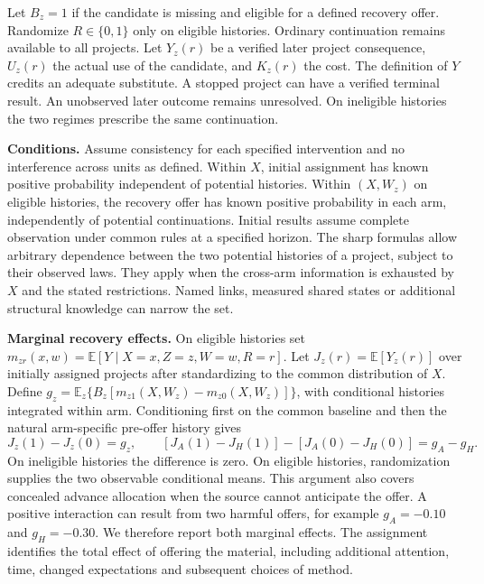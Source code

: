 \documentclass[11pt,a4paper]{article}
\newcommand{\lead}[1]{\textbf{#1}\enspace}
\newcommand{\E}{\mathbb{E}}
\begin{document}
Let $B_z=1$ if the candidate is missing and eligible for a defined recovery offer. Randomize $R\in\{0,1\}$ only on eligible histories. Ordinary continuation remains available to all projects. Let $Y_z(r)$ be a verified later project consequence, $U_z(r)$ the actual use of the candidate, and $K_z(r)$ the cost. The definition of $Y$ credits an adequate substitute. A stopped project can have a verified terminal result. An unobserved later outcome remains unresolved. On ineligible histories the two regimes prescribe the same continuation.

\lead{Conditions.} Assume consistency for each specified intervention and no interference across units as defined. Within $X$, initial assignment has known positive probability independent of potential histories. Within $(X,W_z)$ on eligible histories, the recovery offer has known positive probability in each arm, independently of potential continuations. Initial results assume complete observation under common rules at a specified horizon. The sharp formulas allow arbitrary dependence between the two potential histories of a project, subject to their observed laws. They apply when the cross-arm information is exhausted by $X$ and the stated restrictions. Named links, measured shared states or additional structural knowledge can narrow the set.

\lead{Marginal recovery effects.} On eligible histories set $m_{zr}(x,w)=\E[Y\mid X=x,Z=z,W=w,R=r]$. Let $J_z(r)=\E[Y_z(r)]$ over initially assigned projects after standardizing to the common distribution of $X$. Define $g_z=\E_z\{B_z[m_{z1}(X,W_z)-m_{z0}(X,W_z)]\}$, with conditional histories integrated within arm. Conditioning first on the common baseline and then the natural arm-specific pre-offer history gives
\begin{equation}
 J_z(1)-J_z(0)=g_z,\qquad [J_A(1)-J_H(1)]-[J_A(0)-J_H(0)]=g_A-g_H .
\end{equation}
On ineligible histories the difference is zero. On eligible histories, randomization supplies the two observable conditional means. This argument also covers concealed advance allocation when the source cannot anticipate the offer. A positive interaction can result from two harmful offers, for example $g_A=-0.10$ and $g_H=-0.30$. We therefore report both marginal effects. The assignment identifies the total effect of offering the material, including additional attention, time, changed expectations and subsequent choices of method.
\end{document}
